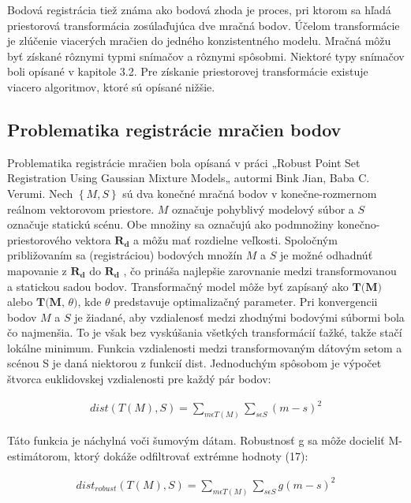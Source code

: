 Bodová registrácia tiež známa ako bodová zhoda je proces, pri ktorom sa hľadá priestorová transformácia zosúlaďujúca dve mračná bodov. Účelom transformácie je zlúčenie viacerých mračien do jedného konzistentného modelu. Mračná môžu byť získané rôznymi typmi snímačov a rôznymi spôsobmi. Niektoré typy snímačov boli opísané v kapitole 3.2. Pre získanie priestorovej transformácie existuje viacero algoritmov, ktoré sú opísané nižšie.

\subsection{Problematika registrácie mračien bodov}

Problematika registrácie mračien bola opísaná v práci „Robust Point Set Registration Using Gaussian Mixture Models„ autormi Bink Jian, Baba C. Verumi. Nech $\left\lbrace M, S \right\rbrace $ sú dva konečné mračná bodov v konečne-rozmernom reálnom vektorovom priestore. $M$ označuje pohyblivý modelový súbor a $S$ označuje statickú scénu. Obe množiny sa označujú ako podmnožiny konečno-priestorového vektora $\textbf{R}_{\textbf{d}}$ a môžu mať rozdielne veľkosti. Spoločným približovaním sa (registráciou) bodových množín $M$ a $S$ je možné odhadnúť mapovanie z $\textbf{R}_\textbf{d}$ do $\textbf{R}_\textbf{d}$ , čo prináša najlepšie zarovnanie medzi transformovanou a statickou sadou bodov. Transformačný model môže byť zapísaný ako $\textbf{T(M)}$ alebo $\textbf{T(M, $\theta$)}$, kde $\theta$ predstavuje optimalizačný parameter. Pri konvergencii bodov $M$ a $S$ je žiadané, aby vzdialenosť medzi zhodnými bodovými súbormi bola čo najmenšia. To je však bez vyskúšania všetkých transformácií ťažké, takže stačí lokálne minimum. Funkcia vzdialenosti medzi transformovaným dátovým setom a scénou S je daná niektorou z funkcií dist. Jednoduchým spôsobom je výpočet štvorca euklidovskej vzdialenosti pre každý pár bodov:

\begin{equation}
\label{eq8}
\begin{aligned}
dist\left(T\left(M\right),S\right)=\sum_{m\epsilon T\left(M\right)} \sum_{s\epsilon S} \left(m-s\right)^2
\end{aligned}
\end{equation}

Táto funkcia je náchylná voči šumovým dátam. Robustnosť g sa môže docieliť M-estimátorom, ktorý dokáže odfiltrovať extrémne hodnoty (17):

\begin{equation}
\label{eq9}
\begin{aligned}
dist_{robust}\left(T\left(M\right),S\right)=\sum_{m\epsilon T\left(M\right)} \sum_{s\epsilon S} g\left(m-s\right)^2
\end{aligned}
\end{equation}

